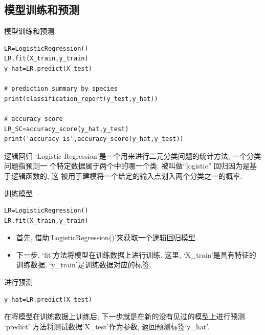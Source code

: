 \documentclass{beamer}
\begin{document}
\subsection{模型训练和预测}
\begin{frame}[fragile]{模型训练和预测}
	\begin{verbatim}
LR=LogisticRegression()
LR.fit(X_train,y_train)
y_hat=LR.predict(X_test)

# prediction summary by species
print(classification_report(y_test,y_hat))

# accuracy score
LR_SC=accuracy_score(y_hat,y_test)
print('accuracy is',accuracy_score(y_hat,y_test))
\end{verbatim}
\end{frame}

\begin{frame}[fragile]{逻辑回归}
	`Logistic Regression'是一个用来进行二元分类问题的统计方法, 一个分类问题指预测一
	个特定数据属于两个中的哪一个类. 被叫做``logistic'' 回归因为是基于逻辑函数的, 这
	被用于建模将一个给定的输入点划入两个分类之一的概率.
\end{frame}

\begin{frame}[fragile]{训练模型}
	\begin{verbatim}
LR=LogisticRegression()
LR.fit(X_train,y_train)
\end{verbatim}
	\begin{itemize}
		\item 首先, 借助`LogisticRegression()'来获取一个逻辑回归模型.
		\item 下一步, `fit'方法将模型在训练数据上进行训练. 这里, `X\_train'是具有特征的
		      训练数据, `y\_train'是训练数据对应的标签.
	\end{itemize}
\end{frame}

\begin{frame}[fragile]{进行预测}
	\begin{verbatim}
y_hat=LR.predict(X_test)
	\end{verbatim}
	在将模型在训练数据上训练后, 下一步就是在新的没有见过的模型上进行预测. `predict'
	方法将测试数据`X\_test'作为参数, 返回预测标签`y\_hat'.
\end{frame}
\end{document}
